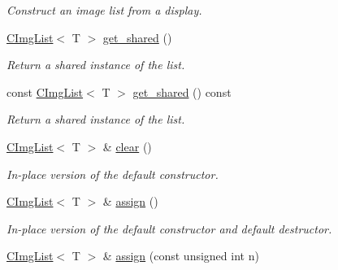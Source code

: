 \begin{DoxyCompactItemize}
\begin{DoxyCompactList}\small\item\em Construct an image list from a display. \item\end{DoxyCompactList}\item 
\hypertarget{structcimg__library_1_1CImgList_a2543c94bba6d151572cc1d232717bb7d}{
\hyperlink{structcimg__library_1_1CImgList}{CImgList}$<$ T $>$ \hyperlink{structcimg__library_1_1CImgList_a2543c94bba6d151572cc1d232717bb7d}{get\_\-shared} ()}
\label{structcimg__library_1_1CImgList_a2543c94bba6d151572cc1d232717bb7d}

\begin{DoxyCompactList}\small\item\em Return a shared instance of the list. \item\end{DoxyCompactList}\item 
\hypertarget{structcimg__library_1_1CImgList_a84bd68353b8a12155b71d2f275e84dc6}{
const \hyperlink{structcimg__library_1_1CImgList}{CImgList}$<$ T $>$ \hyperlink{structcimg__library_1_1CImgList_a84bd68353b8a12155b71d2f275e84dc6}{get\_\-shared} () const }
\label{structcimg__library_1_1CImgList_a84bd68353b8a12155b71d2f275e84dc6}

\begin{DoxyCompactList}\small\item\em Return a shared instance of the list. \item\end{DoxyCompactList}\item 
\hyperlink{structcimg__library_1_1CImgList}{CImgList}$<$ T $>$ \& \hyperlink{structcimg__library_1_1CImgList_ab7aec05f7791abe11f1d0f0cdc8bd24e}{clear} ()
\begin{DoxyCompactList}\small\item\em In-\/place version of the default constructor. \item\end{DoxyCompactList}\item 
\hypertarget{structcimg__library_1_1CImgList_ac1fdedd65f2728500da3af7e94c19ae2}{
\hyperlink{structcimg__library_1_1CImgList}{CImgList}$<$ T $>$ \& \hyperlink{structcimg__library_1_1CImgList_ac1fdedd65f2728500da3af7e94c19ae2}{assign} ()}
\label{structcimg__library_1_1CImgList_ac1fdedd65f2728500da3af7e94c19ae2}

\begin{DoxyCompactList}\small\item\em In-\/place version of the default constructor and default destructor. \item\end{DoxyCompactList}\item 
\hypertarget{structcimg__library_1_1CImgList_a6157637aebbb3b6680ae06ca7d2a2281}{
\hyperlink{structcimg__library_1_1CImgList}{CImgList}$<$ T $>$ \& \hyperlink{structcimg__library_1_1CImgList_a6157637aebbb3b6680ae06ca7d2a2281}{assign} (const unsigned int n)}
\label{structcimg__library_1_1CImgList_a6157637aebbb3b6680ae06ca7d2a2281}


\end{DoxyCompactItemize}

